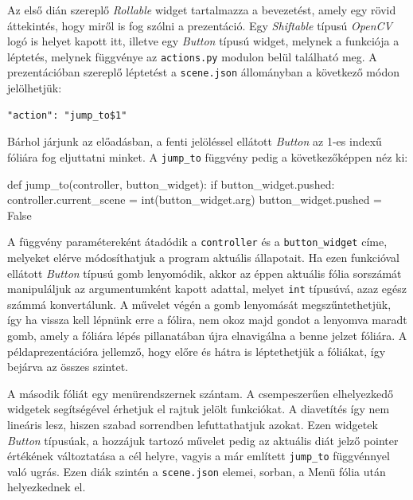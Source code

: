 Az első dián szereplő \textit{Rollable} widget tartalmazza a bevezetést, amely egy rövid áttekintés, hogy miről is fog szólni a prezentáció. Egy \textit{Shiftable} típusú \textit{OpenCV} logó is helyet kapott itt, illetve egy \textit{Button} típusú widget, melynek a funkciója a léptetés, melynek függvénye az \texttt{actions.py} modulon belül található meg. A prezentációban szereplő léptetést a \texttt{scene.json} állományban a következő módon jelölhetjük:
\begin{verbatim}
"action": "jump_to$1"
\end{verbatim}
Bárhol járjunk az előadásban, a fenti jelöléssel ellátott \textit{Button} az 1-es indexű fóliára fog eljuttatni minket. A \texttt{jump\_to} függvény pedig a következőképpen néz ki:
\begin{python}
def jump_to(controller, button_widget):
    if button_widget.pushed:
        controller.current_scene = int(button_widget.arg)
        button_widget.pushed = False
\end{python}
A függvény paramétereként átadódik a \texttt{controller} és a \texttt{button\_widget} címe, melyeket elérve módosíthatjuk a program aktuális állapotait. Ha ezen funkcióval ellátott \textit{Button} típusú gomb lenyomódik, akkor az éppen aktuális fólia sorszámát manipuláljuk az argumentumként kapott adattal, melyet \texttt{int} típusúvá, azaz egész számmá konvertálunk. A művelet végén a gomb lenyomását megszűntethetjük, így ha vissza kell lépnünk erre a fólira, nem okoz majd gondot a lenyomva maradt gomb, amely a fóliára lépés pillanatában újra elnavigálna a benne jelzet fóliára.
A példaprezentációra jellemző, hogy előre és hátra is léptethetjük a fóliákat, így bejárva az összes szintet.

A második fóliát egy menürendszernek szántam. A csempeszerűen elhelyezkedő widgetek segítségével érhetjuk el rajtuk jelölt funkciókat. A diavetítés így nem lineáris lesz, hiszen szabad sorrendben lefuttathatjuk azokat. Ezen widgetek \textit{Button} típusúak, a hozzájuk tartozó művelet pedig az aktuális diát jelző pointer értékének változtatása a cél helyre, vagyis a már említett \texttt{jump\_to} függvénnyel való ugrás. Ezen diák szintén a \texttt{scene.json} elemei, sorban, a Menü fólia után helyezkednek el.

